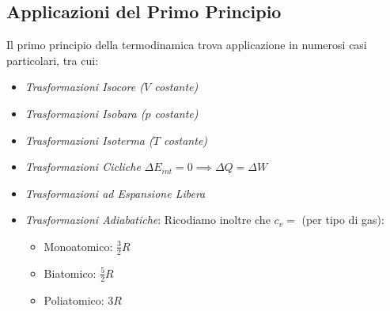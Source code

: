         \subsection*{Applicazioni del Primo Principio} Il primo principio della 
        termodinamica trova applicazione in numerosi casi particolari, tra cui:
            \begin{itemize}
                \item \textit{Trasformazioni Isocore ($V$ costante)}
                \item \textit{Trasformazioni Isobara ($p$ costante)}
                \item \textit{Trasformazioni Isoterma ($T$ costante)}
                \item \textit{Trasformazioni Cicliche}
                    $\Delta E_{int} = 0 \implies \Delta Q = \Delta W$
                \item \textit{Trasformazioni ad Espansione Libera}
                \item \textit{Trasformazioni Adiabatiche}: Ricodiamo 
                        inoltre che $c_v = $ (per tipo di gas):
                        \begin{itemize}
                            \item Monoatomico: $\frac{3}{2} R$
                            \item Biatomico: $\frac{5}{2} R$
                            \item Poliatomico: $3 R$
                        \end{itemize}
            \end{itemize}

